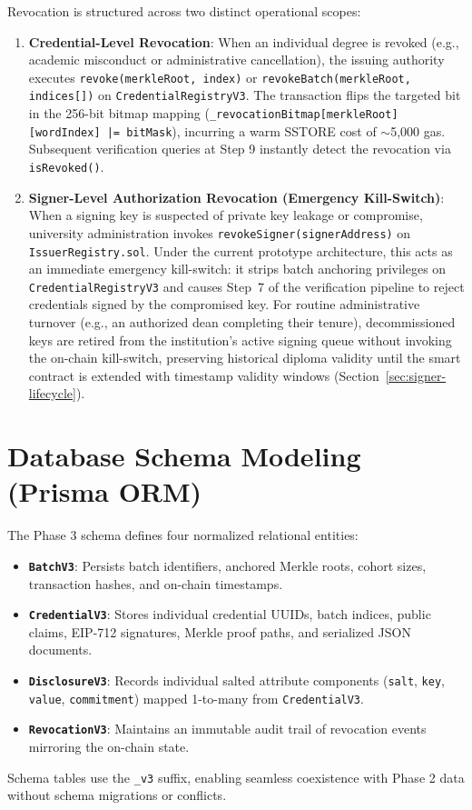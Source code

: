 Revocation is structured across two distinct operational scopes:
\begin{enumerate}
    \item \textbf{Credential-Level Revocation}: When an individual degree is revoked (e.g., academic misconduct or administrative cancellation), the issuing authority executes \texttt{revoke(merkleRoot, index)} or \texttt{revokeBatch(merkleRoot, indices[])} on \texttt{CredentialRegistryV3}. The transaction flips the targeted bit in the 256-bit bitmap mapping (\texttt{\_revocationBitmap[merkleRoot][wordIndex] |= bitMask}), incurring a warm SSTORE cost of $\sim$5,000 gas. Subsequent verification queries at Step 9 instantly detect the revocation via \texttt{isRevoked()}.
    \item \textbf{Signer-Level Authorization Revocation (Emergency Kill-Switch)}: When a signing key is suspected of private key leakage or compromise, university administration invokes \texttt{revokeSigner(signerAddress)} on \texttt{IssuerRegistry.sol}. Under the current prototype architecture, this acts as an immediate emergency kill-switch: it strips batch anchoring privileges on \texttt{CredentialRegistryV3} and causes Step~7 of the verification pipeline to reject credentials signed by the compromised key. For routine administrative turnover (e.g., an authorized dean completing their tenure), decommissioned keys are retired from the institution's active signing queue without invoking the on-chain kill-switch, preserving historical diploma validity until the smart contract is extended with timestamp validity windows (Section~\ref{sec:signer-lifecycle}).
\end{enumerate}

\section{Database Schema Modeling (Prisma ORM)}

The Phase 3 schema defines four normalized relational entities:
\begin{itemize}
    \item \textbf{\texttt{BatchV3}}: Persists batch identifiers, anchored Merkle roots, cohort sizes, transaction hashes, and on-chain timestamps.
    \item \textbf{\texttt{CredentialV3}}: Stores individual credential UUIDs, batch indices, public claims, EIP-712 signatures, Merkle proof paths, and serialized JSON documents.
    \item \textbf{\texttt{DisclosureV3}}: Records individual salted attribute components (\texttt{salt}, \texttt{key}, \texttt{value}, \texttt{commitment}) mapped 1-to-many from \texttt{CredentialV3}.
    \item \textbf{\texttt{RevocationV3}}: Maintains an immutable audit trail of revocation events mirroring the on-chain state.
\end{itemize}

Schema tables use the \texttt{\_v3} suffix, enabling seamless coexistence with Phase 2 data without schema migrations or conflicts.
